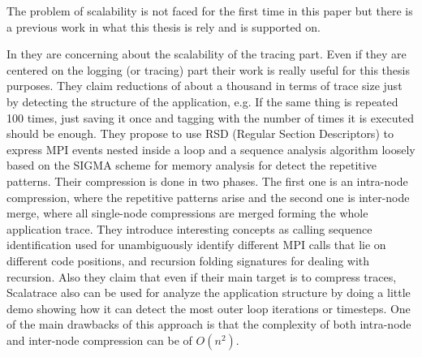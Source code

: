 \documentclass[12pt]{report}
\begin{document}
The problem of scalability is not faced for the first time in this paper but
there is a previous work in what this thesis is rely and is supported on. 

In \cite{noeth2009scalatrace} they are concerning about the scalability of the
tracing part. Even if they are centered on the logging (or tracing) part their
work is really useful for this thesis purposes. They claim reductions of about a
thousand in terms of trace size just by detecting the structure of the
application, e.g. If the same thing is repeated 100 times, just saving it once
and tagging with the number of times it is executed should be enough. They
propose to use RSD (Regular Section Descriptors) to express MPI events nested
inside a loop and a sequence analysis algorithm loosely based on the SIGMA
scheme for memory analysis for detect the repetitive patterns. Their compression
is done in two phases. The first one is an intra-node compression, where the
repetitive patterns arise and the second one is inter-node merge, where all
single-node compressions are merged forming the whole application trace.
They introduce interesting concepts as calling sequence identification used for
unambiguously identify different MPI calls that lie on different code positions, 
and recursion folding signatures for dealing with recursion. Also they claim
that even if their main target is to compress traces, Scalatrace also can be
used for analyze the application structure by doing a little demo showing how it
can detect the most outer loop iterations or timesteps. One of the main
drawbacks of this approach is that the complexity of both intra-node and
inter-node compression can be of $O(n^2)$.
\end{document}
